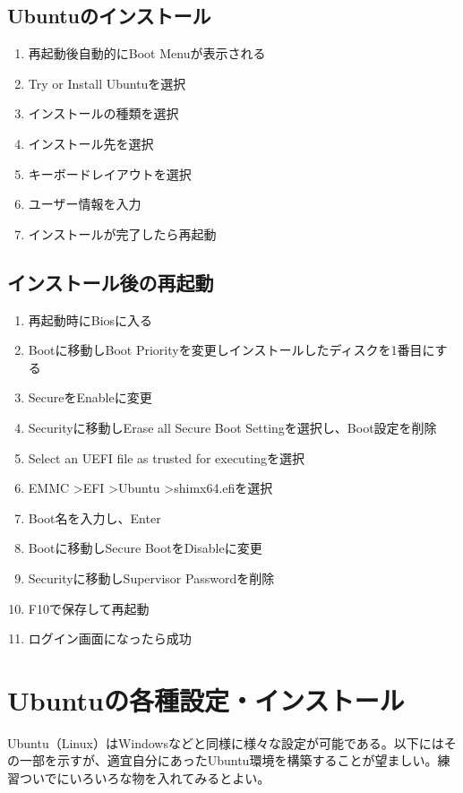 \documentclass[a4paper, 11pt, dvipdfmx]{jsarticle}
\begin{document}
\subsection{Ubuntuのインストール}
  \begin{enumerate}
    \item 再起動後自動的にBoot Menuが表示される
    \item Try or Install Ubuntuを選択
    \item インストールの種類を選択
    \item インストール先を選択
    \item キーボードレイアウトを選択
    \item ユーザー情報を入力
    \item インストールが完了したら再起動
  \end{enumerate}
\subsection{インストール後の再起動}
  \begin{enumerate}
    \item 再起動時にBiosに入る
    \item Bootに移動しBoot Priorityを変更しインストールしたディスクを1番目にする
    \item SecureをEnableに変更
    \item Securityに移動しErase all Secure Boot Settingを選択し、Boot設定を削除
    \item Select an UEFI file as trusted for executingを選択
    \item EMMC \textgreater EFI \textgreater Ubuntu \textgreater shimx64.efiを選択
    \item Boot名を入力し、Enter
    \item Bootに移動しSecure BootをDisableに変更
    \item Securityに移動しSupervisor Passwordを削除
    \item F10で保存して再起動
    \item ログイン画面になったら成功
  \end{enumerate}

\section{Ubuntuの各種設定・インストール}
Ubuntu（Linux）はWindowsなどと同様に様々な設定が可能である。以下にはその一部を示すが、適宜自分にあったUbuntu環境を構築することが望ましい。練習ついでにいろいろな物を入れてみるとよい。
\end{document}
